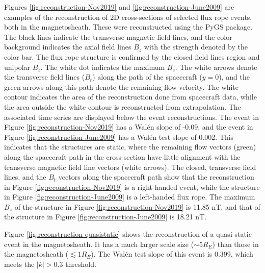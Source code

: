 Figures \ref{fig:reconstruction-Nov2019} and \ref{fig:reconstruction-June2009} are examples of the reconstruction of 2D cross-sections of selected flux rope events, both in the magnetosheath. These were reconstructed using the PyGS package. The black lines indicate the transverse magnetic field lines, and the color background indicates the axial field lines $B_z$ with the strength denoted by the color bar. The flux rope structure is confirmed by the closed field lines region and unipolar $B_z$. The white dot indicates the maximum $B_z$. The white arrows denote the transverse field lines ($B_t$) along the path of the spacecraft ($y=0$), and the green arrows along this path denote the remaining flow velocity. The white contour indicates the area of the reconstruction done from spacecraft data, while the area outside the white contour is reconstructed from extrapolation. The associated time series are displayed below the event reconstructions. The event in Figure \ref{fig:reconstruction-Nov2019} has a Wal\'en slope of -0.09, and the event in Figure \ref{fig:reconstruction-June2009} has a Wal\'en test slope of 0.002. This indicates that the structures are static, where the remaining flow vectors (green) along the spacecraft path in the cross-section have little alignment with the transverse magnetic field line vectors (white arrows). The closed, transverse field lines, and the $B_t$ vectors along the spacecraft path show that the reconstruction in Figure \ref{fig:reconstruction-Nov2019} is a right-handed event, while the structure in Figure \ref{fig:reconstruction-June2009} is a left-handed flux rope. The maximum $B_z$ of the structure in Figure \ref{fig:reconstruction-Nov2019} is 11.85 nT, and that of the structure in Figure \ref{fig:reconstruction-June2009} is 18.21 nT. 

Figure \ref{fig:reconstruction-quasistatic} shows the reconstruction of a quasi-static event in the magnetosheath. It has a much larger scale size ($\sim 5 R_E$) than those in the magnetosheath ($\lesssim 1 R_E$). The Wal\'en test slope of this event is 0.399, which meets the $|k| > 0.3$ threshold.


